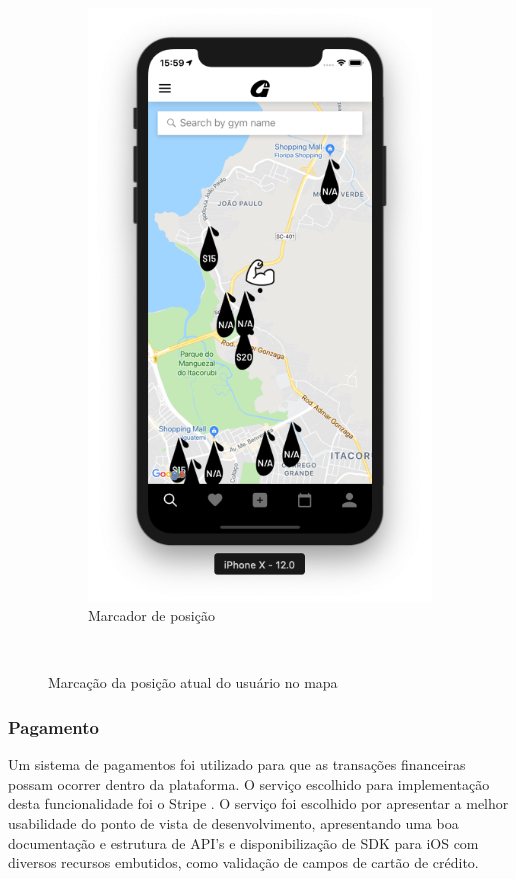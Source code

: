 \begin{figure}[H]
\begin{subfigure}[b]{0.4\textwidth}
        \includegraphics[width=\textwidth]{pfc/figuras/tr-home.png}
        \caption{Marcador de posição}
        \label{fig:muscle-marker}
    \end{subfigure}
    ~
    \caption{Marcação da posição atual do usuário no mapa}
    \label{fig:user-position}
\end{figure}

\subsubsection{Pagamento}
Um sistema de pagamentos foi utilizado para que as transações financeiras possam ocorrer dentro da plataforma. O serviço escolhido para implementação desta funcionalidade foi o Stripe . O serviço foi escolhido por apresentar a melhor usabilidade do ponto de vista de desenvolvimento, apresentando uma boa documentação e estrutura de API's e disponibilização de SDK para iOS com diversos recursos embutidos, como validação de campos de cartão de crédito.

